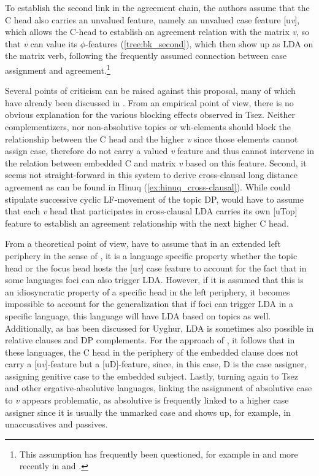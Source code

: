 \documentclass[output=paper
,modfonts
,nonflat]{langsci/langscibook}
\begin{document}
\noindent To establish the second link in the agreement chain, the authors assume that the C head also carries an unvalued feature, namely an unvalued case feature [u\textit{v}], which allows the C-head to establish an agreement relation with the matrix \textit{v}, so that \textit{v} can value its $ \phi $-features (\ref{tree:bk_second}), which then show up as LDA on the matrix verb, following the frequently assumed connection between case assignment and agreement.\footnote{This assumption has frequently been questioned, for example in \citet{Bobaljik2008} and more recently in \citet{Baker_Bobaljik2015} and \cite{Barany2015}.}

Several points of criticism can be raised against this proposal, many of which have already been discussed in \citet{Preminger_Polinsky2015}. From an empirical point of view, there is no obvious explanation for the various blocking effects observed in Tsez. Neither complementizers, nor non-absolutive topics or wh-elements should block the relationship between the C head and the higher \textit{v} since those elements cannot assign case, therefore do not carry a valued \textit{v} feature and thus cannot intervene in the relation between embedded C and matrix \textit{v} based on this feature. Second, it seems not straight-forward in this system to derive cross-clausal long distance agreement as can be found in Hinuq (\ref{ex:hinuq_cross-clausal}). While \citet{Polinsky_Potsdam2001} could stipulate successive cyclic LF-movement of the topic DP, \citet{Bjorkman_Zeijlstra2014} would have to assume that each \textit{v} head that participates in cross-clausal LDA carries its own [uTop] feature to establish an agreement relationship with the next higher C head.

\noindent From a theoretical point of view, \citet{Bjorkman_Zeijlstra2014} have to assume that in an extended left periphery in the sense of \citet{Rizzi1997}, it is a language specific property whether the topic head or the focus head hosts the [u\textit{v}] case feature to account for the fact that in some languages foci can also trigger LDA. However, if it is assumed that this is an idiosyncratic property of a specific head in the left periphery, it becomes impossible to account for the generalization that if foci can trigger LDA in a specific language, this language will have LDA based on topics as well. Additionally, as has been discussed for Uyghur, LDA is sometimes also possible in relative clauses and DP complements. For the approach of \citet{Bjorkman_Zeijlstra2014}, it follows that in these languages, the C head in the periphery of the embedded clause does not carry a [u\textit{v}]-feature but a [uD]-feature, since, in this case, D is the case assigner, assigning genitive case to the embedded subject. Lastly, turning again to Tsez and other ergative-absolutive languages, linking the assignment of absolutive case to \textit{v} appears problematic, as absolutive is frequently linked to a higher case assigner since it is usually the unmarked case and shows up, for example, in unaccusatives and passives.
\end{document}
